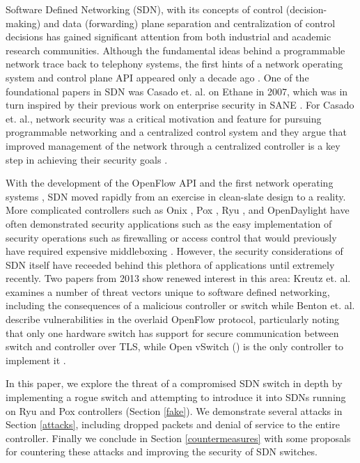 Software Defined Networking (SDN), with its concepts of control (decision-making) and data (forwarding) plane separation and centralization of control decisions has gained significant attention from both industrial and academic research communities.  Although the fundamental ideas behind a programmable network trace back to telephony systems, the first hints of a network operating system and control plane API appeared only a decade ago \cite{history}.  One of the foundational papers in SDN was Casado et. al. on Ethane in 2007\cite{ethane}, which was in turn inspired by their previous work on enterprise security in SANE \cite{sane}.  For Casado et. al., network security was a critical motivation and feature for pursuing programmable networking and a centralized control system and they argue that improved management of the network through a centralized controller is a key step in achieving their security goals \cite{ethane}.

With the development of the OpenFlow API and the first network operating systems \cite{openflow}\cite{nox}, SDN moved rapidly from an exercise in clean-slate design to a reality.  More complicated controllers such as Onix \cite{onix}, Pox \cite{pox}, Ryu \cite{ryu}, and OpenDaylight\cite{opendaylight} have often demonstrated security applications such as the easy implementation of security operations such as firewalling or access control that would previously have required expensive middleboxing \cite{resonance}.  However, the security considerations of SDN itself have receeded behind this plethora of applications until extremely recently.  Two papers from 2013 show renewed interest in this area: Kreutz et. al. examines a number of threat vectors unique to software defined networking, including the consequences of a malicious controller or switch \cite{sdnsec} while Benton et. al. describe vulnerabilities in the overlaid OpenFlow protocol, particularly noting that only one hardware switch has support for secure communication between switch and controller over TLS, while Open vSwitch (\cite{openvswitch}) is the only controller to implement it \cite{benton}.

In this paper, we explore the threat of a compromised SDN switch in depth by implementing a rogue switch and attempting to introduce it into SDNs running on Ryu and Pox controllers (Section \ref{fake}).  We demonstrate several attacks in Section \ref{attacks}, including dropped packets and denial of service to the entire controller.  Finally we conclude in Section \ref{countermeasures} with some proposals for countering these attacks and improving the security of SDN switches.


